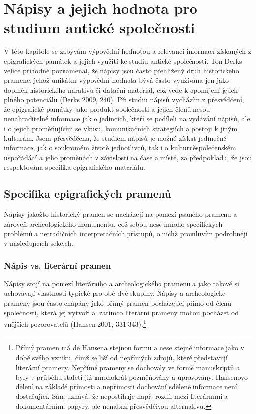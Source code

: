 \chapter{\crlf
}
\chapter{Nápisy a jejich hodnota pro studium antické společnosti}
V této kapitole se zabývám výpovědní hodnotou a relevancí informací získaných z epigrafických památek a jejich využití ke studiu antické společnosti. Ton Derks velice příhodně poznamenal, že nápisy jsou často přehlížený druh historického pramene, jehož unikátní výpovědní hodnota bývá často využívána jen jako doplněk historického narativu či datační materiál, což vede k opomíjení jejich plného potenciálu (Derks 2009, 240). Při studiu nápisů vycházím z přesvědčení, že epigrafické památky jako produkt společnosti a jejich členů nesou nenahraditelné informace jak o jedincích, kteří se podíleli na vydávání nápisů, ale i o jejich proměňujícím se vkusu, komunikačních strategiích a postoji k jiným kulturám. Jsem přesvědčena, že studiem nápisů je možné získat jedinečné informace, jak o soukromém životě jednotlivců, tak i o kulturněspolečenském uspořádání a jeho proměnách v závislosti na čase a místě, za předpokladu, že jsou respektována specifika epigrafického materiálu.

\section[specifika-epigrafických-pramenů]{Specifika epigrafických pramenů}

Nápisy jakožto historický pramen se nacházejí na pomezí psaného pramenu a zároveň archeologického monumentu, což sebou nese mnoho specifických problémů a netradičních interpretačních přístupů, o nichž promluvím podrobněji v následujících sekcích.

\subsection[nápis-vs.-literární-pramen]{Nápis vs. literární pramen}

Nápisy stojí na pomezí literárního a archeologického pramenu a jako takové si uchovávají vlastnosti typické pro obě dvě skupiny. Nápisy a archeologické prameny jsou často chápány jako přímý pramen pocházející přímo od členů společnosti, která jej vytvořila, zatímco literární prameny mohou pocházet od vnějších pozorovatelů (Hansen 2001, 331-343).\footnote{Přímý pramen má de Hansena stejnou formu a nese stejné informace jako v době svého vzniku, čímž se liší od nepřímých zdrojů, které představují literární prameny. Nepřímé prameny se dochovaly ve formě manuskriptů a byly v průběhu staletí již mnohokrát pozměňovány a upravovány. Hansenovo dělení na základě přímosti a nepřímosti dochování sdělené informace není dostačující. Sám uznává, že nepostihuje např. rozdíl mezi literárními a dokumentárními papyry, ale nenabízí přesvědčivou alternativu.}


